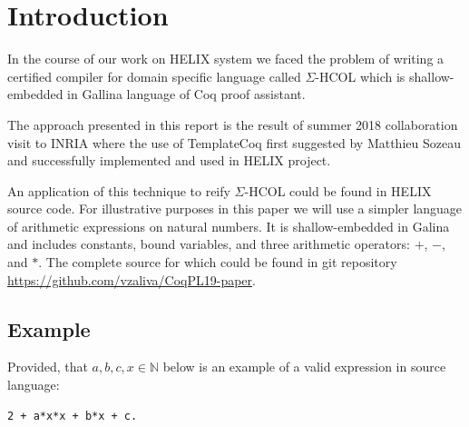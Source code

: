 \documentclass[sigplan]{acmart}\settopmatter{printfolios=true,printccs=false,printacmref=false}
\newcommand{\N}{\mathbb{N}}
\begin{document}


\maketitle

\section{Introduction}

In the course of our work on HELIX system\cite{helixFHPC18} we faced
the problem of writing a certified compiler for domain specific
language called $\Sigma$-HCOL which is shallow-embedded in Gallina
language of Coq\cite{Coq} proof assistant.

The approach presented in this report is the result of summer 2018
collaboration visit to INRIA where the use of
TemplateCoq\cite{anand2018towards} first suggested by Matthieu Sozeau
and successfully implemented and used in HELIX project.

An application of this technique to reify $\Sigma$-HCOL could be found
in HELIX source code. For illustrative purposes in this paper we will
use a simpler language of arithmetic expressions on natural
numbers. It is shallow-embedded in Galina and includes constants,
bound variables, and three arithmetic operators: $+$, $-$, and
$*$. The complete source for which could be found in git repository
\url{https://github.com/vzaliva/CoqPL19-paper}.

\subsection{Example}

Provided, that $a, b, c, x \in \N$ below is an example of a valid
expression in source language:

\begin{lstlisting}[language=Coq, mathescape=true,
  frame=single, basicstyle=\footnotesize,
  caption=Expression in source language,
  label=lst:sexp]
2 + a*x*x + b*x + c.
\end{lstlisting}
\end{document}
